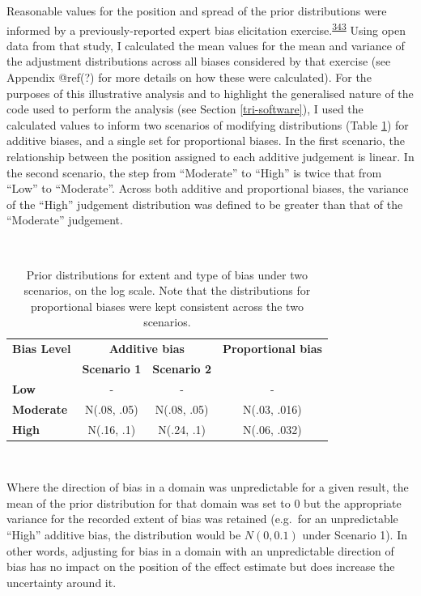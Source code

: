 \documentclass[a4paper, twoside]{templates/ociamthesis}
\begin{document}
Reasonable values for the position and spread of the prior distributions were informed by a previously-reported expert bias elicitation exercise.\textsuperscript{\protect\hyperlink{ref-turner2009}{343}} Using open data from that study, I calculated the mean values for the mean and variance of the adjustment distributions across all biases considered by that exercise (see Appendix @ref(?) for more details on how these were calculated). For the purposes of this illustrative analysis and to highlight the generalised nature of the code used to perform the analysis (see Section \ref{tri-software}), I used the calculated values to inform two scenarios of modifying distributions (Table \ref{tab:priorsAdd-table}) for additive biases, and a single set for proportional biases. In the first scenario, the relationship between the position assigned to each additive judgement is linear. In the second scenario, the step from ``Moderate'' to ``High'' is twice that from ``Low'' to ``Moderate''. Across both additive and proportional biases, the variance of the ``High'' judgement distribution was defined to be greater than that of the ``Moderate'' judgement.

~





\begin{table}[H]

\caption[Prior distributions mapped to different extents of bias.]{\label{tab:priorsAdd-table}Prior distributions for extent and type of bias under two scenarios, on the log scale. Note that the distributions for proportional biases were kept consistent across the two scenarios.}
\centering
\begin{tabular}[t]{>{}lccc}
\toprule
\multicolumn{1}{c}{\textbf{Bias Level}} & \multicolumn{2}{c}{\textbf{Additive bias}} & \multicolumn{1}{c}{\textbf{Proportional bias}} \\
\textbf{} & \textbf{Scenario 1} & \textbf{Scenario 2} & \textbf{}\\
\midrule
\textbf{Low} & - & - & -\\
\midrule
\textbf{Moderate} & N(.08, .05) & N(.08, .05) & N(.03, .016)\\
\midrule
\textbf{High} & N(.16, .1) & N(.24, .1) & N(.06, .032)\\
\bottomrule
\end{tabular}
\end{table}

~

Where the direction of bias in a domain was unpredictable for a given result, the mean of the prior distribution for that domain was set to 0 but the appropriate variance for the recorded extent of bias was retained (e.g.~for an unpredictable ``High'' additive bias, the distribution would be \(N(0,0.1)\) under Scenario 1). In other words, adjusting for bias in a domain with an unpredictable direction of bias has no impact on the position of the effect estimate but does increase the uncertainty around it.
\end{document}
